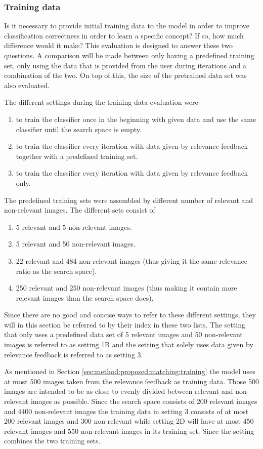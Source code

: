 \subsubsection{Training data}
\label{sec:method:eval:param:training}

Is it necessary to provide initial training data to the model in order to improve classification correctness in order to learn a specific concept? If so, how much difference would it make? This evaluation is designed to answer these two questions. A comparison will be made between only having a predefined training set, only using the data that is provided from the user during iterations and a combination of the two. On top of this, the size of the pretrained data set was also evaluated. 

The different settings during the training data evaluation were 
\begin{enumerate}
	\item to train the classifier once in the beginning with given data and use the same classifier until the search space is empty. 
	\item to train the classifier every iteration with data given by relevance feedback together with a predefined training set. 
	\item to train the classifier every iteration with data given by relevance feedback only.
\end{enumerate}
\medskip
The predefined training sets were assembled by different number of relevant and non-relevant images. The different sets consist of
\begin{enumerate}[label=\Alph*.]
	\item 5 relevant and 5 non-relevant images.
	\item 5 relevant and 50 non-relevant images.
	\item 22 relevant and 484 non-relevant images (thus giving it the same relevance ratio as the search space).
	\item 250 relevant and 250 non-relevant images (thus making it contain more relevant images than the search space does).
\end{enumerate}
\medskip
Since there are no good and concise ways to refer to these different settings, they will in this section be referred to by their index in these two lists. The setting that only uses a predefined data set of 5 relevant images and 50 non-relevant images is referred to as setting 1B and the setting that solely uses data given by relevance feedback is referred to as setting 3.

As mentioned in Section \ref{sec:method:proposed:matching:training} the model uses at most 500 images taken from the relevance feedback as training data. Those 500 images are intended to be as close to evenly divided between relevant and non-relevant images as possible. Since the search space consists of 200 relevant images and 4400 non-relevant images the training data in setting 3 consists of at most 200 relevant images and 300 non-relevant while setting 2D will have at most 450 relevant images and 550 non-relevant images in its training set. 
Since the setting combines the two training sets.